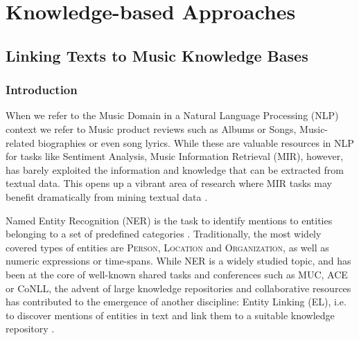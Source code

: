 \part{Knowledge-based Approaches}
\label{part:knowledge-based}

\chapter{Linking Texts to Music Knowledge Bases}
\label{sec:background}


\section{Introduction}


When we refer to the Music Domain in a Natural Language Processing (NLP) context we refer to Music product reviews such as Albums or Songs, Music-related biographies or even song lyrics. While these are valuable resources in NLP for tasks like Sentiment Analysis, Music Information Retrieval (MIR), however, has barely exploited the information and knowledge that can be extracted from textual data. This opens up a vibrant area of research where MIR tasks may benefit dramatically from mining textual data \cite{Sordo2015}. 

Named Entity Recognition (NER) is the task to identify mentions to entities belonging to a set of predefined categories \cite{ZhouandJian2002}. Traditionally, the most widely covered types of entities are \textsc{Person}, \textsc{Location} and \textsc{Organization}, as well as numeric expressions or time-spans. While NER is a widely studied topic, and has been at the core of well-known shared tasks and conferences \cite{Nadeau2007} such as MUC, ACE or CoNLL, the advent of large knowledge repositories and collaborative resources has contributed to the emergence of another discipline: Entity Linking (EL), i.e. to discover mentions of entities in text and link them to a suitable knowledge repository \cite{Moroetal2014}.


